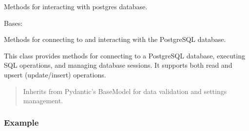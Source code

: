 \documentclass[letterpaper,10pt,english]{sphinxmanual}
\begin{document}
\begin{fulllineitems}
\begin{fulllineitems}
\begin{quote}
\begin{description}
\end{description}\end{quote}

\end{fulllineitems}


\end{fulllineitems}

\label{\detokenize{src:module-src.db_utils.postgres}}
\sphinxAtStartPar
Methods for interacting with postgres database.

\begin{fulllineitems}
\label{\detokenize{src:src.db_utils.postgres.PostgreSQLDB}}
\pysigstartsignatures
{}
\pysigstopsignatures
\sphinxAtStartPar
Bases: 

\sphinxAtStartPar
Methods for connecting to and interacting with the PostgreSQL database.

\sphinxAtStartPar
This class provides methods for connecting to a PostgreSQL database, executing SQL operations,
and managing database sessions. It supports both read and upsert (update/insert) operations.
\begin{quote}\begin{description}
\sphinxAtStartPar
{} \textendash{} Inherits from Pydantic’s BaseModel for data validation and settings management.

\end{description}\end{quote}
\subsubsection*{Example}

\begin{sphinxVerbatim}[commandchars=\\\{\}]
  
 
     
\end{sphinxVerbatim}


\end{fulllineitems}
\end{document}
